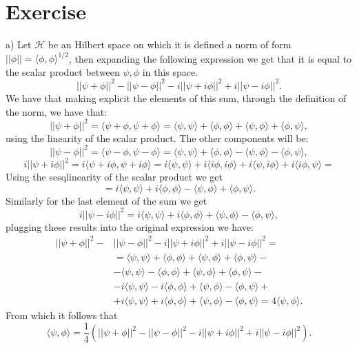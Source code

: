 \documentclass{article}
\begin{document}
\section{Exercise}
a) Let $\mathcal H$ be an Hilbert space on which it is defined a norm of form $||\phi|| = \langle \phi, \phi \rangle^{1/2}$, then expanding the following expression we get that it is equal to the scalar product between $\psi, \phi$ in this space.
\[
    ||\psi + \phi||^2 - ||\psi - \phi||^2 - i||\psi + i\phi||^2 + i||\psi - i\phi||^2.
\]
We have that making explicit the elements of this sum, through the definition of the norm, we have that:
\[
    ||\psi + \phi||^2 = \langle \psi +\phi, \psi +\phi\rangle = \langle \psi, \psi \rangle + \langle \phi,\phi \rangle + \langle \psi, \phi \rangle + \langle \phi , \psi \rangle,
\]
using the linearity of the scalar product. The other components will be:
\[
    ||\psi - \phi||^2 = \langle \psi -\phi, \psi -\phi\rangle = \langle \psi, \psi \rangle + \langle \phi,\phi \rangle - \langle \psi, \phi \rangle - \langle \phi , \psi \rangle,
\]
\[
    i||\psi + i\phi||^2 = i\langle \psi + i\phi, \psi +i \phi\rangle = i\langle \psi, \psi \rangle + i\langle i\phi,i\phi \rangle + i\langle \psi, i\phi \rangle + i\langle i\phi , \psi \rangle =
\]
Using the sesqlinearity of the scalar product we get
\[
    = i\langle \psi, \psi \rangle + i\langle \phi,\phi \rangle - \langle \psi, \phi \rangle + \langle \phi , \psi \rangle.
\]
Similarly for the last element of the sum we get
\[
   i||\psi - i\phi||^2 = i\langle \psi, \psi \rangle + i\langle \phi,\phi \rangle + \langle \psi, \phi \rangle - \langle \phi , \psi \rangle,
\]
plugging these results into the original expression we have:
\[
    \begin{split}
        ||\psi + \phi||^2 - &||\psi - \phi||^2 - i||\psi + i\phi||^2 + i||\psi - i\phi||^2 = \\
        &= \langle \psi, \psi \rangle + \langle \phi,\phi \rangle + \langle \psi, \phi \rangle + \langle \phi , \psi \rangle -\\
        &-\langle \psi, \psi \rangle - \langle \phi,\phi \rangle + \langle \psi, \phi \rangle + \langle \phi , \psi \rangle -\\
        & -i\langle \psi, \psi \rangle - i\langle \phi,\phi \rangle + \langle \psi, \phi \rangle - \langle \phi , \psi \rangle+\\
        &+ i\langle \psi, \psi \rangle + i\langle \phi,\phi \rangle + \langle \psi, \phi \rangle - \langle \phi , \psi \rangle = 4 \langle \psi, \phi \rangle.
    \end{split}
\]
From which it follows that
\[
    \langle \psi, \phi \rangle = \frac{1}{4} ( ||\psi + \phi||^2 - ||\psi - \phi||^2 - i||\psi + i\phi||^2 + i||\psi - i\phi||^2).
\]
\end{document}
